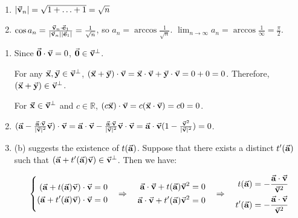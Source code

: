 \begin{exercise}{19}
  \begin{enumerate}
    \item $|\vec{\mathbf{v}}_n| = \sqrt{1 + \hdots + 1} = \sqrt{n}$
    \item $\cos{a_n} = \frac{\vec{\mathbf{v}}_n \cdot \vec{\mathbf{e}}_1}{|\vec{\mathbf{v}}_n||\vec{\mathbf{e}}_1|} = \frac{1}{\sqrt{n}}$, so $a_n = \arccos{\frac{1}{\sqrt{n}}}$. $\lim_{n \to \infty} a_n = \arccos{\frac{1}{\infty}} = \frac{\pi}{2}$.
  \end{enumerate}
\end{exercise}

\begin{exercise}{24}
  \def \Set {\Vect{v}^{\bot}}
  \begin{enumerate}
    \item Since $\vec{\mathbf{0}} \cdot \vec{\mathbf{v}} = 0$, $\Vect{0} \in \Set$.
    
          For any $\Vect{x}, \Vect{y} \in \Set$, $(\vec{\mathbf{x}} + \vec{\mathbf{y}}) \cdot \vec{\mathbf{v}} = \vec{\mathbf{x}} \cdot \vec{\mathbf{v}} + \vec{\mathbf{y}} \cdot \vec{\mathbf{v}} = 0 + 0 = 0$. Therefore, $(\Vect{x} + \Vect{y}) \in \Set$.
          
          For $\Vect{x} \in \Set$ and $c \in \mathbb{R}$, $(c\vec{\mathbf{x}}) \cdot \vec{\mathbf{v}} = c(\vec{\mathbf{x}} \cdot \vec{\mathbf{v}}) = c0 = 0$. \rQED
    
    \item $(\vec{\mathbf{a}} - \frac{\vec{\mathbf{a}} \cdot \vec{\mathbf{v}}}{|\vec{\mathbf{v}}|^2}\vec{\mathbf{v}}) \cdot \vec{\mathbf{v}} =
            \vec{\mathbf{a}} \cdot \vec{\mathbf{v}} - \frac{\vec{\mathbf{a}}\cdot\vec{\mathbf{v}}}{|\vec{\mathbf{v}}|^2}\vec{\mathbf{v}} \cdot \vec{\mathbf{v}} =
            \vec{\mathbf{a}} \cdot \vec{\mathbf{v}}(1 - \frac{\vec{\mathbf{v}}^2}{|\vec{\mathbf{v}}|^2}) = 0$. \rQED
            
    \item (b) suggests the existence of $t(\vec{\mathbf{a}})$. Suppose that there exists a distinct $t'(\vec{\mathbf{a}})$ such that $(\Vect{a} + t'(\Vect{a})\Vect{v}) \in \Set$. Then we have:
    
         $$\left\{
         \begin{aligned}
            (\vec{\mathbf{a}} + t(\vec{\mathbf{a}})\vec{\mathbf{v}}) \cdot \vec{\mathbf{v}} = 0 \\
            (\vec{\mathbf{a}} + t'(\vec{\mathbf{a}})\vec{\mathbf{v}}) \cdot \vec{\mathbf{v}} = 0
         \end{aligned} \quad \Rightarrow \quad
         \begin{aligned}
            \vec{\mathbf{a}} \cdot \vec{\mathbf{v}} + t(\vec{\mathbf{a}})\vec{\mathbf{v}}^2 = 0 \\
            \vec{\mathbf{a}} \cdot \vec{\mathbf{v}} + t'(\vec{\mathbf{a}})\vec{\mathbf{v}}^2 = 0
         \end{aligned} \quad \Rightarrow \quad 
         \begin{aligned}
            t(\vec{\mathbf{a}}) = -\frac{\vec{\mathbf{a}} \cdot \vec{\mathbf{v}}}{\vec{\mathbf{v}}^2} \\
            t'(\vec{\mathbf{a}}) = -\frac{\vec{\mathbf{a}} \cdot \vec{\mathbf{v}}}{\vec{\mathbf{v}}^2}
         \end{aligned}
         \right.$$
         

\end{enumerate}
\end{exercise}

